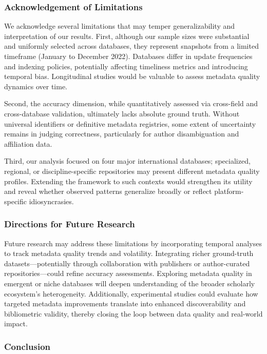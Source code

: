 \documentclass[
  12pt,
]{article}
\begin{document}
\subsubsection{Acknowledgement of
Limitations}\label{acknowledgement-of-limitations}

We acknowledge several limitations that may temper generalizability and
interpretation of our results. First, although our sample sizes were
substantial and uniformly selected across databases, they represent
snapshots from a limited timeframe (January to December 2022). Databases
differ in update frequencies and indexing policies, potentially
affecting timeliness metrics and introducing temporal bias. Longitudinal
studies would be valuable to assess metadata quality dynamics over time.

Second, the accuracy dimension, while quantitatively assessed via
cross-field and cross-database validation, ultimately lacks absolute
ground truth. Without universal identifiers or definitive metadata
registries, some extent of uncertainty remains in judging correctness,
particularly for author disambiguation and affiliation data.

Third, our analysis focused on four major international databases;
specialized, regional, or discipline-specific repositories may present
different metadata quality profiles. Extending the framework to such
contexts would strengthen its utility and reveal whether observed
patterns generalize broadly or reflect platform-specific idiosyncrasies.

\subsubsection{Directions for Future
Research}\label{directions-for-future-research}

Future research may address these limitations by incorporating temporal
analyses to track metadata quality trends and volatility. Integrating
richer ground-truth datasets---potentially through collaboration with
publishers or author-curated repositories---could refine accuracy
assessments. Exploring metadata quality in emergent or niche databases
will deepen understanding of the broader scholarly ecosystem's
heterogeneity. Additionally, experimental studies could evaluate how
targeted metadata improvements translate into enhanced discoverability
and bibliometric validity, thereby closing the loop between data quality
and real-world impact.

\subsubsection{Conclusion}\label{conclusion}
\end{document}
